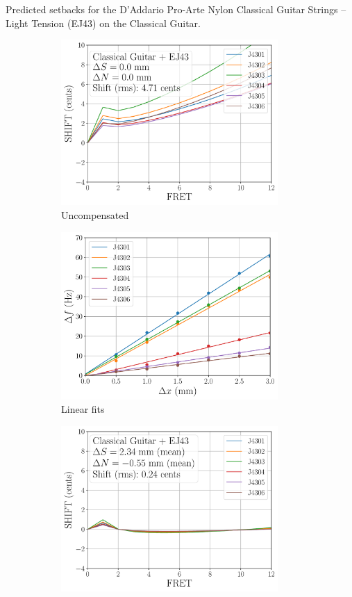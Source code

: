  \begin{table}[htbp]
  \centering
  \caption{\label{tbl:ej43_setbacks} Predicted setbacks for the D'Addario Pro-Arte Nylon Classical Guitar Strings -- Light Tension (EJ43) on the Classical Guitar.}
  
 \end{table}%

 \begin{figure}
  \centering
  \begin{subfigure}[b]{0.45\textwidth}
   \centering
   \includegraphics[width=3.25in]{../figures/shift_classicalguitar_ej43_null}
   \caption{Uncompensated}
   \label{fig:shift_classicalguitar_ej43_null}
  \end{subfigure}
  \hspace{0.25in}
  \begin{subfigure}[b]{0.45\textwidth}
   \centering
   \includegraphics[width=3.25in]{../figures/fit_ej43}
   \caption{Linear fits}
   \label{fig:fit_ej43}
  \end{subfigure}
  \par\vspace{0.25in}
  \begin{subfigure}[b]{0.45\textwidth}
   \centering
   \includegraphics[width=3.25in]{../figures/shift_classicalguitar_ej43_full}

\end{subfigure}
\end{figure}
